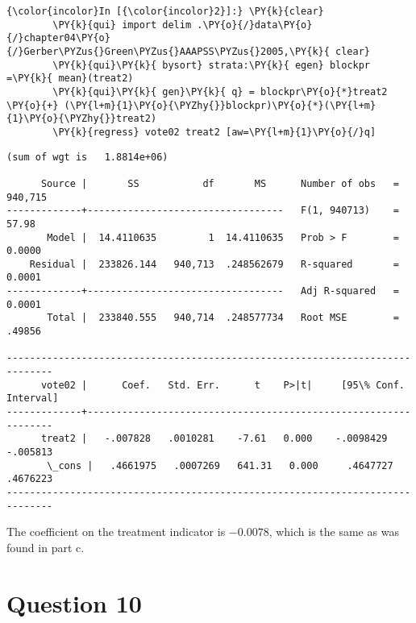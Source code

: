 \documentclass[11pt,notitlepage]{article}\usepackage[]{graphicx}\usepackage[]{color}
\makeatletter
\newenvironment{kframe}{%
 \def\at@end@of@kframe{}%
 \ifinner\ifhmode%
  \def\at@end@of@kframe{\end{minipage}}%
  \begin{minipage}{\columnwidth}%
 \fi\fi%
 \def\FrameCommand##1{\hskip\@totalleftmargin \hskip-\fboxsep
 \colorbox{shadecolor}{##1}\hskip-\fboxsep
     \hskip-\linewidth \hskip-\@totalleftmargin \hskip\columnwidth}%
 \MakeFramed {\advance\hsize-\width
   \@totalleftmargin\z@ \linewidth\hsize
   \@setminipage}}%
 {\par\unskip\endMakeFramed%
 \at@end@of@kframe}
\newenvironment{knitrout}{}{} %
\makeatother
\begin{document}
\begin{enumerate}[a)]
\begin{knitrout}
\color{fgcolor}\begin{kframe}
    \begin{Verbatim}[commandchars=\\\{\}]
{\color{incolor}In [{\color{incolor}2}]:} \PY{k}{clear}
        \PY{k}{qui} import delim .\PY{o}{/}data\PY{o}{/}chapter04\PY{o}{/}Gerber\PYZus{}Green\PYZus{}AAAPSS\PYZus{}2005,\PY{k}{ clear}
        \PY{k}{qui}\PY{k}{ bysort} strata:\PY{k}{ egen} blockpr =\PY{k}{ mean}(treat2)
        \PY{k}{qui}\PY{k}{ gen}\PY{k}{ q} = blockpr\PY{o}{*}treat2 \PY{o}{+} (\PY{l+m}{1}\PY{o}{\PYZhy{}}blockpr)\PY{o}{*}(\PY{l+m}{1}\PY{o}{\PYZhy{}}treat2)
        \PY{k}{regress} vote02 treat2 [aw=\PY{l+m}{1}\PY{o}{/}q]
\end{Verbatim}

    \begin{Verbatim}[commandchars=\\\{\}]
(sum of wgt is   1.8814e+06)

      Source |       SS           df       MS      Number of obs   =   940,715
-------------+----------------------------------   F(1, 940713)    =     57.98
       Model |  14.4110635         1  14.4110635   Prob > F        =    0.0000
    Residual |  233826.144   940,713  .248562679   R-squared       =    0.0001
-------------+----------------------------------   Adj R-squared   =    0.0001
       Total |  233840.555   940,714  .248577734   Root MSE        =    .49856

------------------------------------------------------------------------------
      vote02 |      Coef.   Std. Err.      t    P>|t|     [95\% Conf. Interval]
-------------+----------------------------------------------------------------
      treat2 |   -.007828   .0010281    -7.61   0.000    -.0098429    -.005813
       \_cons |   .4661975   .0007269   641.31   0.000     .4647727    .4676223
------------------------------------------------------------------------------

    \end{Verbatim}
\end{kframe}
\end{knitrout}

The coefficient on the treatment indicator is \ensuremath{-0.0078}, which is the same as was found in part c.

\end{enumerate}


\section*{Question 10}

\begin{knitrout}
\color{fgcolor}\begin{kframe}
\begin{verbatim}






\end{verbatim}
\end{kframe}
\end{knitrout}
\end{document}
